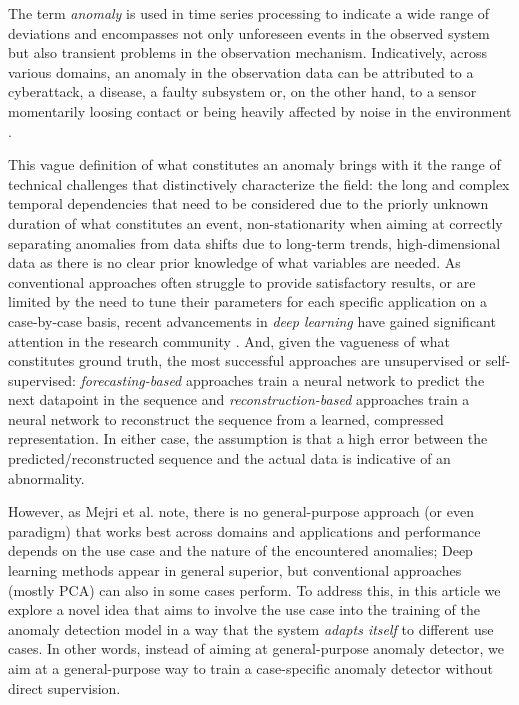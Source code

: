 \documentclass[conference]{IEEEtran}
\begin{document}
The term \emph{anomaly} is used in time series processing to indicate
a wide range of deviations and encompasses not only unforeseen events
in the observed system but also transient problems in the observation
mechanism. Indicatively, across various domains, an anomaly in the
observation data can be attributed to a cyberattack, a disease, a
faulty subsystem or, on the other hand, to a sensor momentarily
loosing contact or being heavily affected by noise in the environment
\cite{laptev_generic_2015,geiger_tadgan:_2020,ji_novel_2021,zhou_anomaly_2021}.

This vague definition of what constitutes an anomaly brings with it
the range of technical challenges that distinctively characterize the
field: the long and complex temporal dependencies that need to be
considered due to the priorly unknown duration of what constitutes an
event, non-stationarity when aiming at correctly separating anomalies
from data shifts due to long-term trends, high-dimensional data as
there is no clear prior knowledge of what variables are needed.
As conventional approaches often struggle to provide satisfactory
results, or are limited by the need to tune their parameters for each
specific application on a case-by-case basis, recent advancements in
\emph{deep learning} have gained significant attention in the research
community \cite{MEJRI2024124922}. And, given the vagueness of what
constitutes ground truth, the most successful approaches are
unsupervised or self-supervised: \emph{forecasting-based} approaches
train a neural network to predict the next datapoint in the sequence
and \emph{reconstruction-based} approaches train a neural network to
reconstruct the sequence from a learned, compressed representation.
In either case, the assumption is that a high error between the
predicted/reconstructed sequence and the actual data is indicative of
an abnormality.

However, as Mejri et al. \cite{MEJRI2024124922} note, there is no
general-purpose approach (or even paradigm) that works best across
domains and applications and performance depends on the use case and
the nature of the encountered anomalies; Deep learning methods appear
in general superior, but conventional approaches (mostly PCA) can also
in some cases perform. To address this, in this article we explore a
novel idea that aims to involve the use case into the training of the
anomaly detection model in a way that the system \emph{adapts itself}
to different use cases. In other words, instead of aiming at
general-purpose anomaly detector, we aim at a general-purpose way to
train a case-specific anomaly detector without direct supervision.
\end{document}
